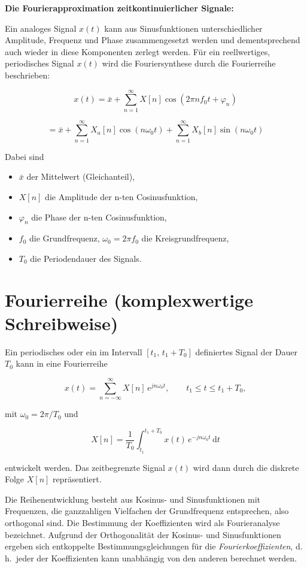 \textbf{Die Fourierapproximation zeitkontinuierlicher Signale:}

Ein analoges Signal $x(t)$ kann aus Sinusfunktionen unterschiedlicher Amplitude, Frequenz und Phase zusammengesetzt werden und dementsprechend auch wieder in diese Komponenten zerlegt werden. Für ein reellwertiges, periodisches Signal $x(t)$ wird die Fouriersynthese durch die Fourierreihe beschrieben:

$$
x(t) = \bar{x} + \sum_{n=1}^{\infty} X[n] \cos(2\pi n f_0 t + \varphi_n)
$$

$$
= \bar{x} + \sum_{n=1}^{\infty} X_a[n] \cos(n\omega_0 t) + \sum_{n=1}^{\infty} X_b[n] \sin(n\omega_0 t)
$$

Dabei sind
\begin{itemize}
  \item $\bar{x}$ der Mittelwert (Gleichanteil),
  \item $X[n]$ die Amplitude der n-ten Cosinusfunktion,
  \item $\varphi_n$ die Phase der n-ten Cosinusfunktion,
  \item $f_0$ die Grundfrequenz, $\omega_0 = 2\pi f_0$ die Kreisgrundfrequenz,
  \item $T_0$ die Periodendauer des Signals.
\end{itemize}

\section{Fourierreihe (komplexwertige Schreibweise)}
\label{sec:fourierreihe-komplex}

Ein periodisches oder ein im Intervall $[t_1,\, t_1 + T_0]$ definiertes Signal der Dauer $T_0$ kann in eine Fourierreihe

$$
x(t) = \sum_{n=-\infty}^{\infty} X[n]\, e^{jn\omega_0 t}, \qquad t_1 \leq t \leq t_1 + T_0,
$$

mit $\omega_0 = 2\pi/T_0$ und

$$
X[n] = \frac{1}{T_0} \int_{t_1}^{t_1+T_0} x(t)\, e^{-jn\omega_0 t}\,\mathrm{d}t
$$

entwickelt werden. Das zeitbegrenzte Signal $x(t)$ wird dann durch die diskrete Folge $X[n]$ repräsentiert.

Die Reihenentwicklung besteht aus Kosinus- und Sinusfunktionen mit Frequenzen, die ganzzahligen Vielfachen der Grundfrequenz entsprechen, also orthogonal sind. Die Bestimmung der Koeffizienten wird als Fourieranalyse bezeichnet. Aufgrund der Orthogonalität der Kosinus- und Sinusfunktionen ergeben sich entkoppelte Bestimmungsgleichungen für die \textit{Fourierkoeffizienten}, d.\,h.\ jeder der Koeffizienten kann unabhängig von den anderen berechnet werden.

